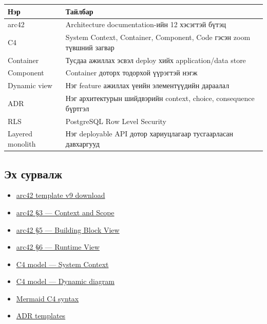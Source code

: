\documentclass[
  mongolian,
]{article}
\providecommand{\tightlist}{%
  \setlength{\itemsep}{0pt}\setlength{\parskip}{0pt}}
\begin{document}
\begin{longtable}[]{@{}
  >{\raggedright\arraybackslash}p{}
  >{\raggedright\arraybackslash}p{}@{}}
\toprule\noalign{}
\begin{minipage}[b]{\linewidth}\raggedright
Нэр
\end{minipage} & \begin{minipage}[b]{\linewidth}\raggedright
Тайлбар
\end{minipage} \\
\midrule\noalign{}
\endhead
\bottomrule\noalign{}
\endlastfoot
arc42 & Architecture documentation-ийн 12 хэсэгтэй бүтэц \\
C4 & System Context, Container, Component, Code гэсэн zoom түвшний
загвар \\
Container & Тусдаа ажиллах эсвэл deploy хийх application/data store \\
Component & Container доторх тодорхой үүрэгтэй нэгж \\
Dynamic view & Нэг feature ажиллах үеийн элементүүдийн дараалал \\
ADR & Нэг архитектурын шийдвэрийн context, choice, consequence
бүртгэл \\
RLS & PostgreSQL Row Level Security \\
Layered monolith & Нэг deployable API дотор хариуцлагаар тусгаарласан
давхаргууд \\
\end{longtable}

\subsection{Эх
сурвалж}\label{ux44dux445-ux441ux443ux440ux432ux430ux43bux436}

\begin{itemize}
\tightlist
\item
  \href{https://arc42.org/download/}{arc42 template v9 download}
\item
  \href{https://docs.arc42.org/section-3/}{arc42 §3 --- Context and
  Scope}
\item
  \href{https://docs.arc42.org/section-5/}{arc42 §5 --- Building Block
  View}
\item
  \href{https://docs.arc42.org/section-6/}{arc42 §6 --- Runtime View}
\item
  \href{https://c4model.com/diagrams/system-context}{C4 model --- System
  Context}
\item
  \href{https://c4model.com/diagrams/dynamic}{C4 model --- Dynamic
  diagram}
\item
  \href{https://mermaid.js.org/syntax/c4}{Mermaid C4 syntax}
\item
  \href{https://adr.github.io/adr-templates/}{ADR templates}
\end{itemize}
\end{document}
